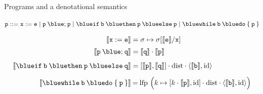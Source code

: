 \documentclass{beamer}
\begin{document}
\begin{frame}{Programs and a denotational semantics}
        \begin{block}{\vspace*{-3.5ex}}
        \begin{center}
        $\prog{p} ::= \mathtt{x} := \mathtt{e} \mid
	\mathtt{p \> {\blue ;} \> p} \mid
	\mathtt{{\blue if} \> b \> {\blue then} \> p \> {\blue else} \> p} \mid
	\mathtt{{\blue while} \> b \> {\blue do} \> \{ \> p \> \}}$
        \end{center}
	\end{block}
        \vspace{-0.5cm}
        \begin{align*}
                \sem{\prog{x : = e}} & = \sigma \mapsto \sigma[\sem{\prog{e}}/\prog{x}] \\[2pt]
                \sem{\prog{p} \> {\blue ;} \> \prog{q}} & 
                = \sem{\prog{q}} \comp \sem{\prog{p}} \\[5pt]
                \sem{\mathtt{{\blue if} \> b \> {\blue then} \> p \> {\blue else} \> q}}
                                                        & 
                                                        = [\sem{\prog{p}},\sem{\prog{q}}] \comp
                                                        \mathrm{dist} \comp \pv{\sem{\prog{b}}}{\id}
                                                        \\[5pt]
                \sem{\mathtt{{\blue while} \> b \> {\blue do} \> \{ \> p \> \}} }
                                                        & \> {=} \> \mathrm{lfp}\ \Big (k \mapsto
                [k \comp 
                \sem{\prog{p}},\id] \comp
                \mathrm{dist} \comp \pv{\sem{\prog{b}}}{\id} \Big )
        \end{align*}
\end{frame}
\end{document}
